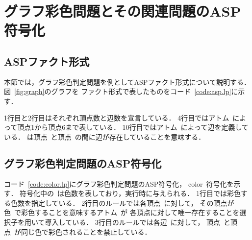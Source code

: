 \chapter{グラフ彩色問題とその関連問題のASP符号化}\label{chap:encoding}

\section{ASPファクト形式}



本節では，グラフ彩色判定問題を例としてASPファクト形式について説明する．
図~\ref{fig:graph}のグラフを
ファクト形式で表したものをコード~\ref{code:asp.lp}に示す．

1行目と2行目はそれぞれ頂点数と辺数を宣言している．
4行目ではアトム~によって頂点1から頂点6まで表している．
10行目ではアトム~によって辺を定義している．
は頂点~と頂点~の間に辺が存在していることを意味する．

\section{グラフ彩色判定問題のASP符号化}



コード~\ref{code:color.lp}にグラフ彩色判定問題のASP符号化，
\textsf{color}~符号化を示す．
符号化中の~は色数を表しており，実行時に与えられる．
1行目では彩色する色数を指定している．
2行目のルールでは各頂点~に対して，
その頂点が色~で彩色することを意味するアトム~が
各頂点に対して唯一存在することを選択子を用いて導入している．
3行目のルールでは各辺~に対して，
頂点~と頂点~が同じ色で彩色されることを禁止している．

